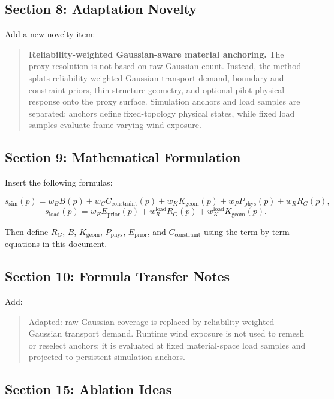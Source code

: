 \documentclass[11pt,a4paper]{article}
\begin{document}
\subsection{Section 8: Adaptation Novelty}

Add a new novelty item:

\begin{quote}
\textbf{Reliability-weighted Gaussian-aware material anchoring.} The proxy resolution is not based on raw Gaussian count. Instead, the method splats reliability-weighted Gaussian transport demand, boundary and constraint priors, thin-structure geometry, and optional pilot physical response onto the proxy surface. Simulation anchors and load samples are separated: anchors define fixed-topology physical states, while fixed load samples evaluate frame-varying wind exposure.
\end{quote}

\subsection{Section 9: Mathematical Formulation}

Insert the following formulas:

\[
s_{\mathrm{sim}}(p)=
 w_B B(p)+w_C C_{\mathrm{constraint}}(p)+w_K K_{\mathrm{geom}}(p)+w_P P_{\mathrm{phys}}(p)+w_R R_G(p),
\]
\[
s_{\mathrm{load}}(p)=w_E E_{\mathrm{prior}}(p)+w_R^{\mathrm{load}}R_G(p)+w_K^{\mathrm{load}}K_{\mathrm{geom}}(p).
\]

Then define $R_G$, $B$, $K_{\mathrm{geom}}$, $P_{\mathrm{phys}}$, $E_{\mathrm{prior}}$, and $C_{\mathrm{constraint}}$ using the term-by-term equations in this document.

\subsection{Section 10: Formula Transfer Notes}

Add:

\begin{quote}
Adapted: raw Gaussian coverage is replaced by reliability-weighted Gaussian transport demand. Runtime wind exposure is not used to remesh or reselect anchors; it is evaluated at fixed material-space load samples and projected to persistent simulation anchors.
\end{quote}

\subsection{Section 15: Ablation Ideas}
\end{document}
